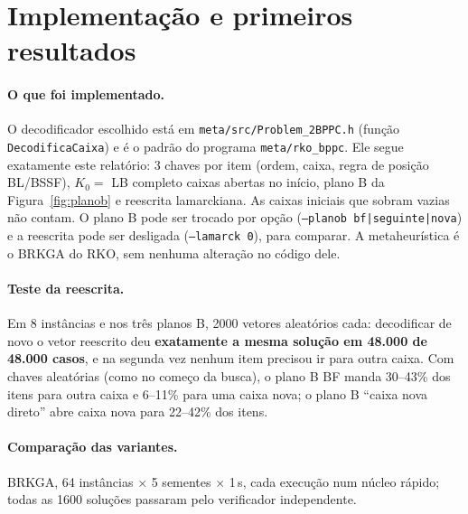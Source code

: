 \documentclass[11pt,a4paper]{article}
\begin{document}
\section{Implementação e primeiros resultados}\label{sec:resultados}
\paragraph{O que foi implementado.} O decodificador escolhido está em \texttt{meta/src/Problem\_2BPPC.h} (função
\texttt{DecodificaCaixa}) e é o padrão do programa \texttt{meta/rko\_bppc}. Ele segue exatamente este relatório:
3 chaves por item (ordem, caixa, regra de posição BL/BSSF), $K_0=$ LB completo caixas abertas no início, plano B da
Figura~\ref{fig:planob} e reescrita lamarckiana. As caixas iniciais que sobram vazias não contam. O plano B pode ser
trocado por opção (\texttt{--planob bf|seguinte|nova}) e a reescrita pode ser desligada (\texttt{--lamarck 0}), para
comparar. A metaheurística é o BRKGA do RKO, sem nenhuma alteração no código dele.

\paragraph{Teste da reescrita.} Em 8 instâncias e nos três planos B, 2000 vetores aleatórios cada: decodificar de novo o
vetor reescrito deu \textbf{exatamente a mesma solução em 48.000 de 48.000 casos}, e na segunda vez nenhum item precisou
ir para outra caixa. Com chaves aleatórias (como no começo da busca), o plano B BF manda 30--43\% dos itens para outra
caixa e 6--11\% para uma caixa nova; o plano B ``caixa nova direto'' abre caixa nova para 22--42\% dos itens.

\paragraph{Comparação das variantes.} BRKGA, 64 instâncias $\times$ 5 sementes $\times$ 1\,s, cada execução num núcleo
rápido; todas as 1600 soluções passaram pelo verificador independente.
\end{document}
